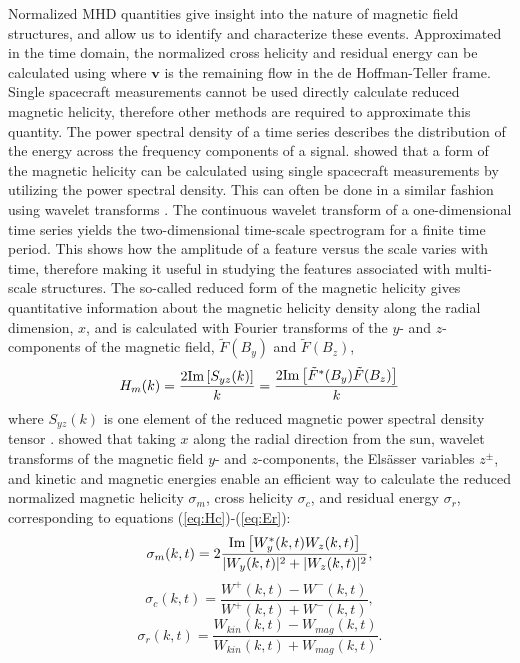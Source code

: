 Normalized MHD quantities give insight into the nature of magnetic field structures, and allow us to identify and characterize these events. Approximated in the time domain, the normalized cross helicity and residual energy can be calculated using
where $\mathbf{v}$ is the remaining flow in the de Hoffman-Teller frame. Single spacecraft measurements cannot be used directly calculate reduced magnetic helicity, therefore other methods are required to approximate this quantity. The power spectral density of a time series describes the distribution of the energy across the frequency components of a signal. \cite{Matthaeus:1982} showed that a form of the magnetic helicity can be calculated using single spacecraft measurements by utilizing the power spectral density. This can often be done in a similar fashion using wavelet transforms \citep{Telloni:2012, Telloni:2013}. The continuous wavelet transform of a one-dimensional time series yields the two-dimensional time-scale spectrogram for a finite time period. This shows how the amplitude of a feature versus the scale varies with time, therefore making it useful in studying the features associated with multi-scale structures. The so-called reduced form of the magnetic helicity gives quantitative information about the magnetic helicity density along the radial dimension, $x$, and is calculated with Fourier transforms of the $y$- and $z$-components of the magnetic field, $\tilde{F}(B_y)$ and $\tilde{F}(B_z)$,
\begin{equation}
    H_m(k) = \frac{2 \textnormal{Im}\left[ S_{yz} (k) \right]}{k} = \frac{2 \textnormal{Im}\left[ \tilde{F}^*(B_y)\tilde{F}(B_z) \right]}{k}
\end{equation}
where $S_{yz}(k)$ is one element of the reduced magnetic power spectral density tensor \citep{Matthaeus:1982}. \cite{Telloni:2012} showed that taking $x$ along the radial direction from the sun, wavelet transforms of the magnetic field $y$- and $z$-components, the Els\"asser variables $z^\pm$, and kinetic and magnetic energies enable an efficient way to calculate the reduced normalized magnetic helicity $\sigma_m$, cross helicity $\sigma_c$, and residual energy $\sigma_r$, corresponding to equations (\ref{eq:Hc})-(\ref{eq:Er}):
\begin{equation}
    \sigma_m(k,t) = 2\frac{\textnormal{Im}\left[ W_y^*(k,t)W_z(k,t) \right]}{|W_y(k,t)|^2 + |W_z(k,t)|^2} ,
    \label{eq:sigm}
\end{equation}
\begin{equation}
        \sigma_c(k,t) = \frac{W^+(k,t)-W^-(k,t)}{W^+(k,t)+W^-(k,t)} ,
        \label{eq:sigc}
\end{equation}
 \begin{equation}
    \sigma_r(k,t) = \frac{W_{kin}(k,t) - W_{mag}(k,t)}{W_{kin}(k,t) + W_{mag}(k,t)} .
    \label{eq:sigr}
\end{equation}

